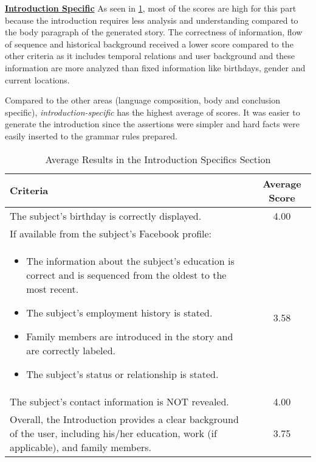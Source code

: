\underline{\textbf{Introduction Specific}}
As seen in \ref{tab:criteria2}, most of the scores are high for this part because the introduction requires less analysis and understanding compared to the body paragraph of the generated story. The correctness of information, flow of sequence and historical background received a lower score compared to the other criteria as it includes temporal relations and user background and these information are more analyzed than fixed information like birthdays, gender and current locations.

Compared to the other areas (language composition, body and conclusion specific), \textit{introduction-specific} has the highest average of scores. It was easier to generate the introduction since the assertions were simpler and hard facts were easily inserted to the grammar rules prepared.

\begin{table}[ph!]   %
	\centering
	\caption{Average Results in the Introduction Specifics Section} \vspace{0.25em}
	\begin{tabular}{|p{2.5in}|c|} \hline
		\centering Criteria & Average Score \\ \hline
		The subject's birthday is correctly displayed. & 4.00 \\ \hline
		If available from the subject's Facebook profile: \\ \begin{itemize}
		\item The information about the subject’s education is correct and is sequenced from the oldest to the most recent.
		\item The subject's employment history is stated.
		\item Family members are introduced in the story and are correctly labeled.
		\item The subject's status or relationship is stated. \end{itemize} & 3.58 \\ \hline
		The subject's contact information is NOT revealed. & 4.00 \\ \hline
		Overall, the Introduction provides a clear background of the user, including his/her education, work (if applicable), and family members. & 3.75 \\ \hline
	\end{tabular}
	\label{tab:criteria2}
\end{table}

